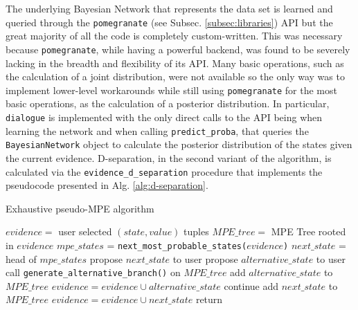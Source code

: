 The underlying Bayesian Network that represents the data set is learned and queried through the  \texttt{pomegranate} (see Subsec. \ref{subsec:libraries}) API but the great majority of all the code is completely custom-written.
This was necessary because \texttt{pomegranate}, while having a powerful backend, was found to be severely lacking in the breadth and flexibility of its API.
Many basic operations, such as the calculation of a joint distribution, were not available so the only way was to implement lower-level workarounds while still using \texttt{pomegranate} for the most basic operations, as the calculation of a posterior distribution.
In particular, \texttt{dialogue} is implemented with the only direct calls to the API being when learning the network and when calling \texttt{predict\_proba}, that queries the \texttt{BayesianNetwork} object to calculate the posterior distribution of the states given the current evidence.
D-separation, in the second variant of the algorithm, is calculated via the \texttt{evidence\_d\_separation} procedure that implements the pseudocode presented in Alg. \ref{alg:d-separation}.

\begin{algorithm}[htp!]
	\caption{Exhaustive pseudo-MPE algorithm}
	\label{alg:pseudo-mpe-exhaustive}
	\begin{algorithmic}
		\STATE $evidence = $ user selected $(state,value)$ tuples
		\STATE $MPE\_tree = $ MPE Tree rooted in $evidence$
			\STATE $mpe\_states$ = \texttt{next\_most\_probable\_states($evidence$)}
				\STATE $next\_state$ = head of $mpe\_states$ 
				\STATE propose $next\_state$ to user 
						\STATE propose $alternative\_state$ to user 
							\STATE call \texttt{generate\_alternative\_branch()} on $MPE\_tree$ 
							\STATE add $alternative\_state$ to $MPE\_tree$
							\STATE $evidence = evidence \cup alternative\_state$
						\ELSE
							\STATE continue
						\ENDIF
					\ENDFOR
				\ELSE
					\STATE add $next\_state$ to $MPE\_tree$
					\STATE $evidence = evidence \cup next\_state$
				\ENDIF
			\ELSE 
				\STATE return
			\ENDIF
		\ENDWHILE
	\end{algorithmic}
\end{algorithm} 

